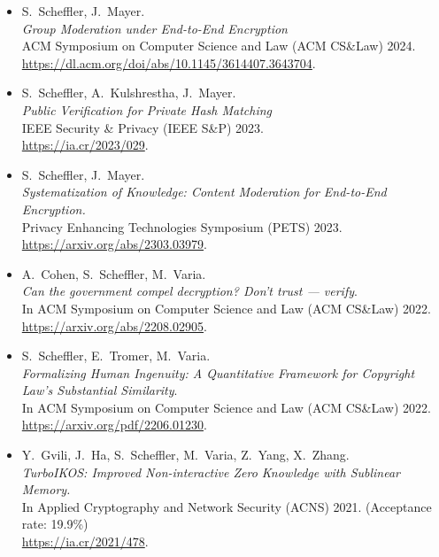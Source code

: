 \documentclass{res}
\begin{document}
\begin{resume}
\begin{itemize}
\item[\eeegroup] S.~Scheffler, J.~Mayer. \\
\emph{Group Moderation under End-to-End Encryption} \\
ACM Symposium on Computer Science and Law (ACM CS\&Law) 2024. \\
\url{https://dl.acm.org/doi/abs/10.1145/3614407.3643704}.

\item[\csamimprovements] S.~Scheffler, A.~Kulshrestha, J.~Mayer. \\
\emph{Public Verification for Private Hash Matching} \\
IEEE Security \& Privacy (IEEE S\&P) 2023. \\
\url{https://ia.cr/2023/029}.

\item[\eeesok] S.~Scheffler, J.~Mayer. \\
\emph{Systematization of Knowledge: Content Moderation for End-to-End Encryption.} \\
Privacy Enhancing Technologies Symposium (PETS) 2023. \\
\url{https://arxiv.org/abs/2303.03979}.

\item[\foregoneVerif] A.~Cohen, S.~Scheffler, M.~Varia. \\
\emph{Can the government compel decryption?  Don't trust --- verify}. \\
In ACM Symposium on Computer Science and Law (ACM CS\&Law) 2022. \\
\url{https://arxiv.org/abs/2208.02905}.

\item[\copyrightMDL] S.~Scheffler, E.~Tromer, M.~Varia. \\
\emph{Formalizing Human Ingenuity: A Quantitative Framework for Copyright Law's Substantial Similarity}. \\
In ACM Symposium on Computer Science and Law (ACM CS\&Law) 2022. \\
\url{https://arxiv.org/pdf/2206.01230}.

\item[\turboikos] Y.~Gvili, J.~Ha, S.~Scheffler, M.~Varia, Z.~Yang, X.~Zhang. \\
\emph{TurboIKOS: Improved Non-interactive Zero Knowledge with Sublinear Memory.} \\
In Applied Cryptography and Network Security (ACNS) 2021. (Acceptance rate: 19.9\%) \\
\url{https://ia.cr/2021/478}.


\end{itemize}
\end{resume}
\end{document}
